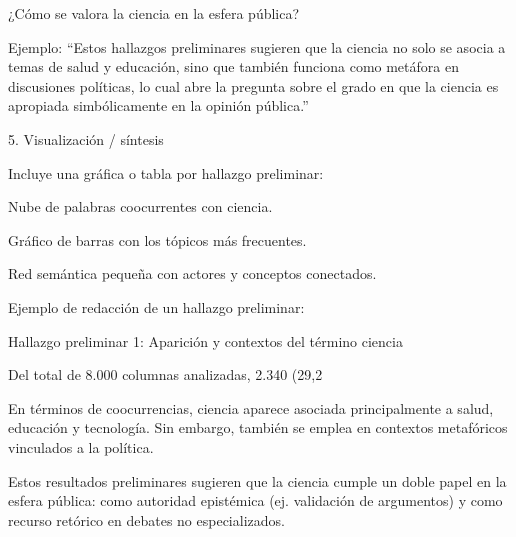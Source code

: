 ¿Cómo se valora la ciencia en la esfera pública?

Ejemplo:
“Estos hallazgos preliminares sugieren que la ciencia no solo se asocia a temas de salud y educación, sino que también funciona como metáfora en discusiones políticas, lo cual abre la pregunta sobre el grado en que la ciencia es apropiada simbólicamente en la opinión pública.”

5. Visualización / síntesis

Incluye una gráfica o tabla por hallazgo preliminar:

Nube de palabras coocurrentes con ciencia.

Gráfico de barras con los tópicos más frecuentes.

Red semántica pequeña con actores y conceptos conectados.

Ejemplo de redacción de un hallazgo preliminar:

Hallazgo preliminar 1: Aparición y contextos del término ciencia

Del total de 8.000 columnas analizadas, 2.340 (29,2%

En términos de coocurrencias, ciencia aparece asociada principalmente a salud, educación y tecnología. Sin embargo, también se emplea en contextos metafóricos vinculados a la política.

Estos resultados preliminares sugieren que la ciencia cumple un doble papel en la esfera pública: como autoridad epistémica (ej. validación de argumentos) y como recurso retórico en debates no especializados.
